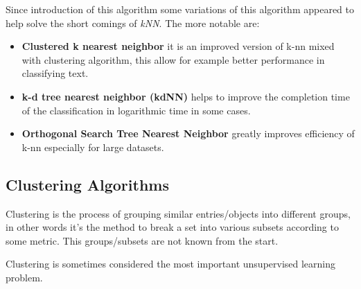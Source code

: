Since introduction of this algorithm some variations of this algorithm appeared to help solve the short comings of \emph{kNN}.\cite{DBLP:journals/corr/abs-1007-0085}
The more notable are:
\begin{itemize}
\item \textbf{Clustered k nearest neighbor} \cite{journals/jcp/ZhouLX09} it is an improved version of k-nn mixed with clustering algorithm, this allow for example 
better performance in classifying text.
\item \textbf{k-d tree nearest neighbor (kdNN)} \cite{Sproull1991} helps to improve the completion time of the classification in logarithmic time in some cases.
\item \textbf{Orthogonal Search Tree Nearest Neighbor} \cite{955110} greatly improves efficiency of k-nn especially for large datasets.
\end{itemize}

\subsection{Clustering Algorithms}\label{sec:clust}

Clustering is the process of grouping similar entries/objects into different groups, in other words it's the method to break a set into various subsets according to some
metric. This groups/subsets are not known from the start.

Clustering is sometimes considered the most important unsupervised learning problem\cite{DBLP:journals/corr/abs-1205-1117}.

